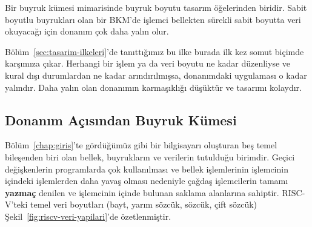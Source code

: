 Bir buyruk kümesi mimarisinde buyruk boyutu tasarım öğelerinden biridir. Sabit boyutlu buyrukları olan bir BKM'de işlemci bellekten sürekli sabit boyutta veri okuyacağı için donanım çok daha yalın olur.

\begin{tanim}
Bölüm~\ref{sec:tasarim-ilkeleri}'de tanıttığımız bu ilke burada ilk kez somut biçimde karşımıza çıkar. Herhangi bir işlem ya da veri boyutu ne kadar düzenliyse ve kural dışı durumlardan ne kadar arındırılmışsa, donanımdaki uygulaması o kadar yalındır. Daha yalın olan donanımın karmaşıklığı düşüktür ve tasarımı kolaydır.
\end{tanim}


\subsection{Donanım Açısından Buyruk Kümesi}

Bölüm~\ref{chap:giris}'te gördüğümüz gibi bir bilgisayarı oluşturan beş temel bileşenden biri olan bellek, buyrukların ve verilerin tutulduğu birimdir. Geçici değişkenlerin programlarda çok kullanılması ve bellek işlemlerinin işlemcinin içindeki işlemlerden daha yavaş olması nedeniyle çağdaş işlemcilerin tamamı \textbf{yazmaç} denilen ve işlemcinin içinde bulunan saklama alanlarına sahiptir. RISC-V'teki temel veri boyutları (bayt, yarım sözcük, sözcük, çift sözcük) Şekil~\ref{fig:riscv-veri-yapilari}'de özetlenmiştir.

